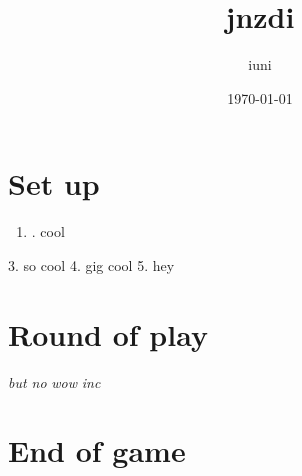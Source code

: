 \documentclass{article}%
\title{jnzdi}%
\author{iuni}%
\date{\today}%
\begin{document}
%
\pagestyle{empty}%
\normalsize%
\maketitle%
\section{ Set up
}%
\label{sec:Setup}%
\begin{enumerate}%
\item%
. cool
%
\end{enumerate}%
3. so cool
%
4. gig cool
%
5. hey


%
\section{ Round of play
}%
\label{sec:Roundofplay}%
\textit{ but no
}%
\textit{ wow
}%
\textit{ inc
}

%
\section{ End of game}%
\label{sec:Endofgame}%

%
\end{document}
